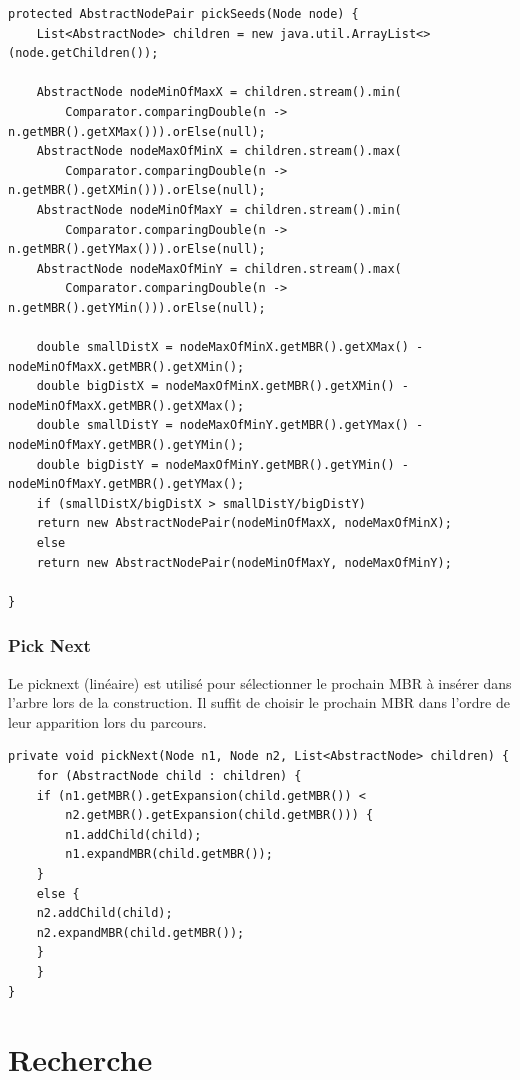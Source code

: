 \documentclass {article}
\begin{document}
\begin{verbatim}
protected AbstractNodePair pickSeeds(Node node) {
    List<AbstractNode> children = new java.util.ArrayList<>(node.getChildren());

    AbstractNode nodeMinOfMaxX = children.stream().min(
	    Comparator.comparingDouble(n -> n.getMBR().getXMax())).orElse(null);
    AbstractNode nodeMaxOfMinX = children.stream().max(
	    Comparator.comparingDouble(n -> n.getMBR().getXMin())).orElse(null);
    AbstractNode nodeMinOfMaxY = children.stream().min(
	    Comparator.comparingDouble(n -> n.getMBR().getYMax())).orElse(null);
    AbstractNode nodeMaxOfMinY = children.stream().max(
	    Comparator.comparingDouble(n -> n.getMBR().getYMin())).orElse(null);

    double smallDistX = nodeMaxOfMinX.getMBR().getXMax() - nodeMinOfMaxX.getMBR().getXMin();
    double bigDistX = nodeMaxOfMinX.getMBR().getXMin() - nodeMinOfMaxX.getMBR().getXMax();
    double smallDistY = nodeMaxOfMinY.getMBR().getYMax() - nodeMinOfMaxY.getMBR().getYMin();
    double bigDistY = nodeMaxOfMinY.getMBR().getYMin() - nodeMinOfMaxY.getMBR().getYMax();
    if (smallDistX/bigDistX > smallDistY/bigDistY) 
	return new AbstractNodePair(nodeMinOfMaxX, nodeMaxOfMinX);
    else
	return new AbstractNodePair(nodeMinOfMaxY, nodeMaxOfMinY);

}
\end{verbatim}

\subsubsection {Pick Next}

Le picknext (linéaire) est utilisé pour sélectionner le prochain MBR à insérer dans l'arbre lors de la construction. 
Il suffit de choisir le prochain MBR dans l'ordre de leur apparition lors du parcours.


\begin{verbatim}
private void pickNext(Node n1, Node n2, List<AbstractNode> children) {
    for (AbstractNode child : children) {
	if (n1.getMBR().getExpansion(child.getMBR()) < 
		n2.getMBR().getExpansion(child.getMBR())) {
	    n1.addChild(child);
	    n1.expandMBR(child.getMBR());
	} 
	else {
	n2.addChild(child);
	n2.expandMBR(child.getMBR());
	}
    }
}
\end{verbatim}

\section {Recherche}\label{recherche}
\end{document}
